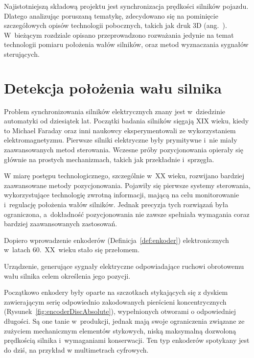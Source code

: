 Najistotniejszą składową projektu jest synchronizacja prędkości silników pojazdu. Dlatego analizując poruszaną tematykę, zdecydowano się na pominięcie szczegółowych opisów technologii pobocznych, takich jak druk 3D (ang.~). W~bieżącym rozdziale opisano przeprowadzono rozważania jedynie na temat technologii pomiaru położenia wałów silników, oraz metod wyznaczania sygnałów sterujących.

\section{Detekcja położenia wału silnika}
\label{ch:analizaenkodery}

Problem synchronizowania silników elektrycznych znany jest w~dziedzinie automatyki od dziesiątek lat. Początki badania silników sięgają XIX wieku, kiedy to Michael Faraday oraz inni naukowcy eksperymentowali ze wykorzystaniem elektromagnetyzmu\cite{bib:pierwszesilniki}. Pierwsze silniki elektryczne były prymitywne i~nie miały zaawansowanych metod sterowania. Wczesne próby pozycjonowania opierały się głównie na prostych mechanizmach, takich jak przekładnie i~sprzęgła.

W miarę postępu technologicznego, szczególnie w~XX wieku, rozwijano bardziej zaawansowane metody pozycjonowania. Pojawiły się pierwsze systemy sterowania, wykorzystujące technologię zwrotną informacji, mającą na celu monitorowanie i~regulację położenia wałów silników. Jednak precyzja tych rozwiązań była ograniczona, a~dokładność pozycjonowania nie zawsze spełniała wymagania coraz bardziej zaawansowanych zastosowań.

Dopiero wprowadzenie enkoderów (Definicja~\ref{def:enkoder}) elektronicznych w~latach 60.~XX~wieku\cite{bib:pierwszeenkodery} stało się przełomem.

\begin{Definition}\label{def:enkoder}
    Urządzenie, generujące sygnały elektryczne odpowiadające ruchowi obrotowemu wału silnika celem określenia jego pozycji. 
\end{Definition}

Początkowo enkodery były oparte na szczotkach stykających się z dyskiem zawierającym serię odpowiednio zakodowanych pierścieni koncentrycznych (Rysunek~\ref{fig:encoderDiscAbsolute}), wypełnionych otworami o odpowiedniej długości\cite{bib:rodzajeenkoderow}. Są one tanie w~produkcji, jednak mają swoje ograniczenia związane ze zużyciem mechanicznym elementów stykowych, niską maksymalną dozwoloną prędkością silnika i~wymaganiami konserwacji. Ten typ enkoderów spotykany jest do dziś, na przykład w multimetrach cyfrowych.

